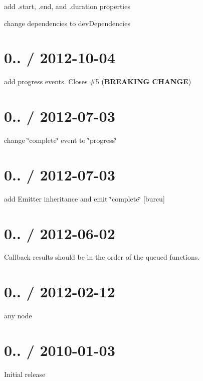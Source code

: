 \begin{DoxyItemize}
\item add .start, .end, and .duration properties
\item change dependencies to dev\+Dependencies
\end{DoxyItemize}

\section*{0.. / 2012-\/10-\/04 }


\begin{DoxyItemize}
\item add progress events. Closes \#5 ({\bfseries B\+R\+E\+A\+K\+I\+NG C\+H\+A\+N\+GE})
\end{DoxyItemize}

\section*{0.. / 2012-\/07-\/03 }


\begin{DoxyItemize}
\item change \char`\"{}complete\char`\"{} event to \char`\"{}progress\char`\"{}
\end{DoxyItemize}

\section*{0.. / 2012-\/07-\/03 }


\begin{DoxyItemize}
\item add Emitter inheritance and emit \char`\"{}complete\char`\"{} \mbox{[}burcu\mbox{]}
\end{DoxyItemize}

\section*{0.. / 2012-\/06-\/02 }


\begin{DoxyItemize}
\item Callback results should be in the order of the queued functions.
\end{DoxyItemize}

\section*{0.. / 2012-\/02-\/12 }


\begin{DoxyItemize}
\item any node
\end{DoxyItemize}

\section*{0.. / 2010-\/01-\/03 }


\begin{DoxyItemize}
\item Initial release 
\end{DoxyItemize}